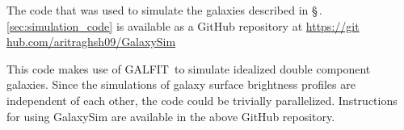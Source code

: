 \documentclass[twocolumn]{aastex63}
\begin{document}
The code that was used to simulate the galaxies described in \S\,.\ref{sec:simulation_code} is available as a GitHub repository at \href{https://github.com/aritraghsh09/GalaxySim}{https://git hub.com/aritraghsh09/GalaxySim}

This code makes use of GALFIT\,\citep{galfit} to simulate idealized double component galaxies. Since the simulations of galaxy surface brightness profiles are independent of each other, the code could be trivially parallelized. Instructions for using GalaxySim are available in the above GitHub repository. 



\end{document}
